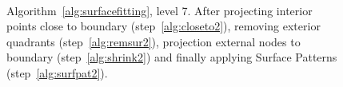 \documentclass[10pt]{article}
\begin{document}
%
\begin{figure}[htb]
\centering
 \\
 \caption{Algorithm~\ref{alg:surfacefitting}, level 7. After projecting interior points close to boundary (step~\ref{alg:closeto2}), removing exterior quadrants (step~\ref{alg:remsur2}), projection external nodes to boundary (step~\ref{alg:shrink2}) and finally applying Surface Patterns (step~\ref{alg:surfpat2}).}
\label{fig:surfacehandling7}
\end{figure}
\end{document}

